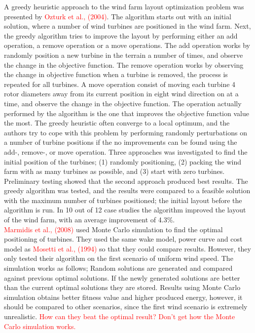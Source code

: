 A greedy heuristic approach to the wind farm layout optimization problem was presented by \textcolor{red}{Ozturk et al., (2004)}. The algorithm starts out with an initial solution, where a number of wind turbines are positioned in the wind farm. Next, the greedy algorithm tries to improve the layout by performing either an add operation, a remove operation or a move operations. The add operation works by randomly position a new turbine in the terrain a number of times, and observe the change in the objective function. The remove operation works by observing the change in objective function when a turbine is removed, the process is repeated for all turbines. A move operation consist of moving each turbine 4 rotor diameters away from its current position in eight wind direction on at a time, and observe the change in the objective function. The operation actually performed by the algorithm is the one that improves the objective function value the most. The greedy heuristic often converge to a local optimum, and the authors try to cope with this problem by performing randomly perturbations on a number of turbine positions if the no improvements can be found using the add-, remove-, or move operation. Three approaches was investigated to find the initial position of the turbines; (1) randomly positioning, (2) packing the wind farm with as many turbines as possible, and (3) start with zero turbines. Preliminary testing showed that the second approach produced best results. The greedy algorithm was tested, and the results were compared to a feasible solution with the maximum number of turbines positioned; the initial layout before the algorithm is run. In 10 out of 12 case studies the algorithm improved the layout of the wind farm, with an average improvement of 4.3\%. \\


\noindent \textcolor{red}{Marmidis et al., (2008)} used Monte Carlo simulation to find the optimal positioning of turbines. They used the same wake model, power curve and cost model as \textcolor{red}{Mosetti et al., (1994)} so that they could compare results. However, they only tested their algorithm on the first scenario of uniform wind speed. The simulation works as follows; Random solutions are generated and compared against previous optimal solutions. If the newly generated solutions are better than the current optimal solutions they are stored. Results using Monte Carlo simulation obtains better fitness value and higher produced energy, however, it should be compared to other scenarios, since the first wind scenario is extremely unrealistic. \textcolor{red}{How can they beat the optimal result? Don't get how the Monte Carlo simulation works.}\\


